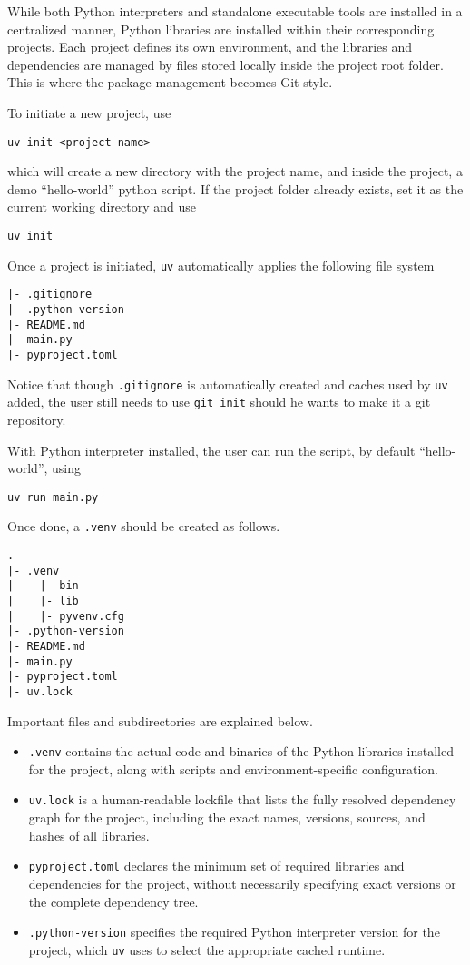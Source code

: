 While both Python interpreters and standalone executable tools are installed in a centralized manner, Python libraries are installed within their corresponding projects. Each project defines its own environment, and the libraries and dependencies are managed by files stored locally inside the project root folder. This is where the package management becomes Git-style.

To initiate a new project, use
\begin{lstlisting}
uv init <project name>
\end{lstlisting}
which will create a new directory with the project name, and inside the project, a demo ``hello-world'' python script. If the project folder already exists, set it as the current working directory and use
\begin{lstlisting}
uv init
\end{lstlisting}

Once a project is initiated, \verb|uv| automatically applies the following file system
\begin{lstlisting}
|- .gitignore
|- .python-version
|- README.md
|- main.py
|- pyproject.toml
\end{lstlisting}

Notice that though \verb|.gitignore| is automatically created and caches used by \verb|uv| added, the user still needs to use \verb|git init| should he wants to make it a git repository.

With Python interpreter installed, the user can run the script, by default ``hello-world'', using
\begin{lstlisting}
uv run main.py
\end{lstlisting}
Once done, a \verb|.venv| should be created as follows.
\begin{lstlisting}
.
|- .venv
|    |- bin
|    |- lib
|    |- pyvenv.cfg
|- .python-version
|- README.md
|- main.py
|- pyproject.toml
|- uv.lock
\end{lstlisting}

Important files and subdirectories are explained below.
\begin{itemize}
	\item \verb|.venv| contains the actual code and binaries of the Python libraries installed for the project, along with scripts and environment-specific configuration.
	\item \verb|uv.lock| is a human-readable lockfile that lists the fully resolved dependency graph for the project, including the exact names, versions, sources, and hashes of all libraries.
	\item \verb|pyproject.toml| declares the minimum set of required libraries and dependencies for the project, without necessarily specifying exact versions or the complete dependency tree.
	\item \verb|.python-version| specifies the required Python interpreter version for the project, which \verb|uv| uses to select the appropriate cached runtime.
\end{itemize}

